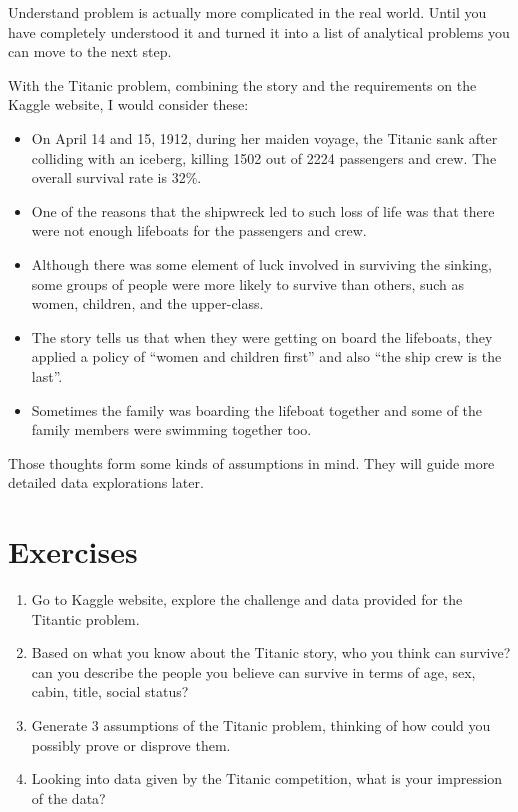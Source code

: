 \documentclass[
]{book}
\providecommand{\tightlist}{%
  \setlength{\itemsep}{0pt}\setlength{\parskip}{0pt}}
\begin{document}
Understand problem is actually more complicated in the real world. Until you have completely understood it and turned it into a list of analytical problems you can move to the next step.

With the Titanic problem, combining the story and the requirements on the Kaggle website, I would consider these:

\begin{itemize}
\tightlist
\item
  On April 14 and 15, 1912, during her maiden voyage, the Titanic sank after colliding with an iceberg, killing 1502 out of 2224 passengers and crew. The overall survival rate is 32\%.
\item
  One of the reasons that the shipwreck led to such loss of life was that there were not enough lifeboats for the passengers and crew.
\item
  Although there was some element of luck involved in surviving the sinking, some groups of people were more likely to survive than others, such as women, children, and the upper-class.
\item
  The story tells us that when they were getting on board the lifeboats, they applied a policy of ``women and children first'' and also ``the ship crew is the last''.
\item
  Sometimes the family was boarding the lifeboat together and some of the family members were swimming together too.
\end{itemize}

Those thoughts form some kinds of assumptions in mind. They will guide more detailed data explorations later.

\hypertarget{exercises-2}{%
\section*{Exercises}\label{exercises-2}}


\begin{enumerate}
\def\labelenumi{\arabic{enumi}.}
\tightlist
\item
  Go to Kaggle website, explore the challenge and data provided for the Titantic problem.
\item
  Based on what you know about the Titanic story, who you think can survive? can you describe the people you believe can survive in terms of age, sex, cabin, title, social status?
\item
  Generate 3 assumptions of the Titanic problem, thinking of how could you possibly prove or disprove them.
\item
  Looking into data given by the Titanic competition, what is your impression of the data?
\end{enumerate}
\end{document}
